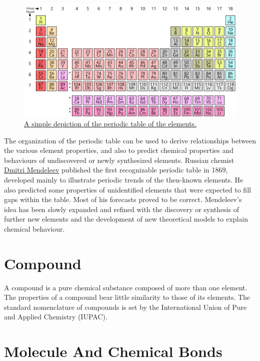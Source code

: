 \begin{figure}

{\centering \includegraphics[width=0.7\linewidth]{./figures/chemistry/Simple_Periodic_Table_Chart-en} 

}

\caption{\href{https://commons.wikimedia.org/wiki/File:Simple_Periodic_Table_Chart-en.svg}{A simple depiction of the periodic table of the elements.}}\label{fig:periodictable}
\end{figure}

The organization of the periodic table can be used to derive relationships between the various element properties, and also to predict chemical properties and behaviours of undiscovered or newly synthesized elements. Russian chemist \href{https://en.wikipedia.org/wiki/Dmitri_Mendeleev}{Dmitri Mendeleev} published the first recognizable periodic table in 1869, developed mainly to illustrate periodic trends of the then-known elements. He also predicted some properties of unidentified elements that were expected to fill gaps within the table. Most of his forecasts proved to be correct. Mendeleev's idea has been slowly expanded and refined with the discovery or synthesis of further new elements and the development of new theoretical models to explain chemical behaviour.

\hypertarget{compound}{%
\section{Compound}\label{compound}}

A compound is a pure chemical substance composed of more than one element. The properties of a compound bear little similarity to those of its elements. The standard nomenclature of compounds is set by the International Union of Pure and Applied Chemistry (IUPAC).

\hypertarget{molecule-and-chemical-bonds}{%
\section{Molecule And Chemical Bonds}\label{molecule-and-chemical-bonds}}

